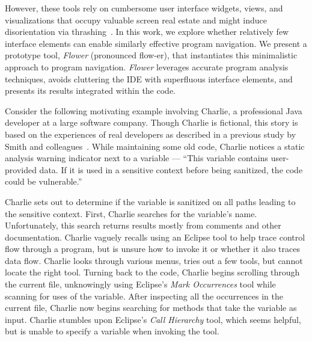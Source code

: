 \documentclass[conference]{IEEEtran}
\begin{document}
However, these tools rely on cumbersome user interface widgets, views, and visualizations that occupy valuable screen real estate and might induce disorientation via thrashing~\cite{deAlwis2006disorient}.
In this work, we explore whether relatively few interface elements can enable similarly effective program navigation.
We present a prototype tool, \textit{Flower} (pronounced flow-er), that instantiates this minimalistic approach to program navigation.
\textit{Flower} leverages accurate program analysis techniques, avoids cluttering the IDE with superfluous interface elements, and presents its results integrated within the code.


Consider the following motivating example involving Charlie, a professional Java developer at a large software company.
Though Charlie is fictional, this story is based on the experiences of real developers as described in a previous study by Smith and colleagues~\cite{Smith2015}.
While maintaining some old code, Charlie notices a static analysis warning indicator next to a variable --- ``This variable contains user-provided data. 
If it is used in a sensitive context before being sanitized, the code could be vulnerable.''

Charlie sets out to determine if the variable is sanitized on all paths leading to the sensitive context.
First, Charlie searches for the variable's name.
Unfortunately, this search returns results mostly from comments and other documentation.
Charlie vaguely recalls using an Eclipse tool to help trace control flow through a program, but is unsure how to invoke it or whether it also traces data flow.
Charlie looks through various menus, tries out a few tools, but cannot locate the right tool.
Turning back to the code, Charlie begins scrolling through the current file, unknowingly using Eclipse's \emph{Mark Occurrences} tool while scanning for uses of the variable. 
After inspecting all the occurrences in the current file, Charlie now begins searching for methods that take the variable as input.
Charlie stumbles upon Eclipse's \emph{Call Hierarchy} tool, which seems helpful, but is unable to specify a variable when invoking the tool.
\end{document}

